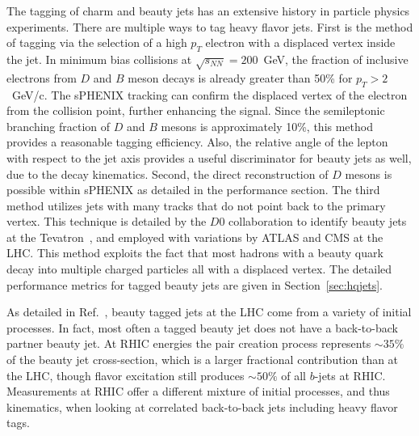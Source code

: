 The tagging of charm and beauty jets has an extensive history in
particle physics experiments.  There are multiple ways to tag heavy
flavor jets.  First is the method of tagging via the selection of a
high $p_{T}$ electron with a displaced vertex inside the jet.  In
minimum bias \auau collisions at $\sqrt{s_{NN}} = 200$~GeV, the
fraction of inclusive electrons from $D$ and $B$ meson decays is
already greater than 50\% for $p_{T} > 2$~GeV/c.  The sPHENIX tracking
can confirm the displaced vertex of the electron from the collision
point, further enhancing the signal.  Since the semileptonic branching
fraction of $D$ and $B$ mesons is approximately 10\%, this method
provides a reasonable tagging efficiency.  Also, the relative angle of
the lepton with respect to the jet axis provides a useful
discriminator for beauty jets as well, due to the decay kinematics.
Second, the direct reconstruction of $D$ mesons is possible within
sPHENIX as detailed in the performance section.  The third method
utilizes jets with many tracks that do not point back to the primary
vertex.  This technique is detailed by the $D0$ collaboration to
identify beauty jets at the Tevatron~\cite{d0_nim}, and employed with
variations by ATLAS and CMS at the LHC.  This method exploits the fact
that most hadrons with a beauty quark decay into multiple charged
particles all with a displaced vertex.  The detailed performance
metrics for tagged beauty jets are given in Section~\ref{sec:hqjets}.

As detailed in Ref.~\cite{Huang:2013vaa}, beauty tagged jets at the
LHC come from a variety of initial processes.  In fact, most often a
tagged beauty jet does not have a back-to-back partner beauty jet.  
At RHIC energies the
pair creation process represents $\sim35\%$ of the beauty jet
cross-section, which is a larger fractional contribution than at the
LHC, though flavor excitation still produces $\sim50\%$ of all $b$-jets
at RHIC.
Measurements at RHIC offer a different mixture of initial processes,
and thus kinematics, when looking at correlated back-to-back jets
including heavy flavor tags.



